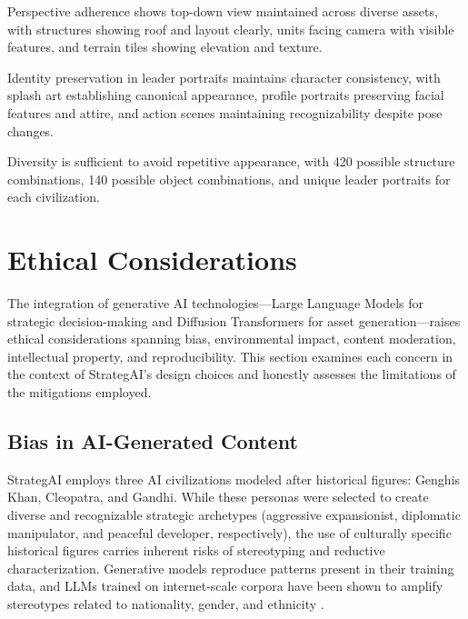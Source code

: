 \documentclass[conference]{IEEEtran}
\begin{document}
Perspective adherence shows top-down view maintained across diverse assets, with structures showing roof and layout clearly, units facing camera with visible features, and terrain tiles showing elevation and texture.

Identity preservation in leader portraits maintains character consistency, with splash art establishing canonical appearance, profile portraits preserving facial features and attire, and action scenes maintaining recognizability despite pose changes.

Diversity is sufficient to avoid repetitive appearance, with 420 possible structure combinations, 140 possible object combinations, and unique leader portraits for each civilization.

\section{Ethical Considerations}
\label{sec:ethics}

The integration of generative AI technologies---Large Language Models for strategic decision-making and Diffusion Transformers for asset generation---raises ethical considerations spanning bias, environmental impact, content moderation, intellectual property, and reproducibility. This section examines each concern in the context of StrategAI's design choices and honestly assesses the limitations of the mitigations employed.

\subsection{Bias in AI-Generated Content}

StrategAI employs three AI civilizations modeled after historical figures: Genghis Khan, Cleopatra, and Gandhi. While these personas were selected to create diverse and recognizable strategic archetypes (aggressive expansionist, diplomatic manipulator, and peaceful developer, respectively), the use of culturally specific historical figures carries inherent risks of stereotyping and reductive characterization. Generative models reproduce patterns present in their training data, and LLMs trained on internet-scale corpora have been shown to amplify stereotypes related to nationality, gender, and ethnicity \cite{bender2021stochastic}.
\end{document}

